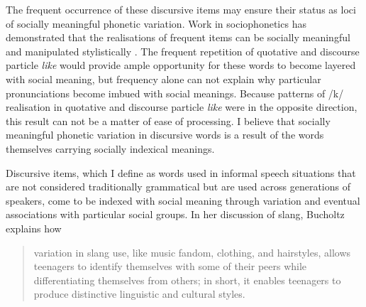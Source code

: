 The frequent occurrence of these discursive items may ensure their status as loci of socially meaningful phonetic variation.  Work in sociophonetics has demonstrated that the realisations of frequent items can be socially meaningful and manipulated stylistically \cite{oprah1999}.  The frequent repetition of quotative and discourse particle \textit{like} would provide ample opportunity for these words to become layered with social meaning, but frequency alone can not explain why particular pronunciations become imbued with social meanings.  Because patterns of /k/ realisation in quotative and discourse particle \textit{like} were in the opposite direction, this result can not be a matter of ease of processing.  I believe that socially meaningful phonetic variation in discursive words is a result of the words themselves carrying socially indexical meanings.


Discursive items, which I define as words used in informal speech situations that are not considered traditionally grammatical but are used across generations of speakers, come to be indexed with social meaning through variation and eventual associations with particular social groups.  In her discussion of slang, Bucholtz explains how

\begin{quote}
	variation in slang use, like music fandom, clothing, and hairstyles, allows teenagers to identify themselves with some of their peers while differentiating themselves from others; in short, it enables teenagers to produce distinctive linguistic and cultural styles. \cite[251]{bucholtz2006}
\end{quote}

